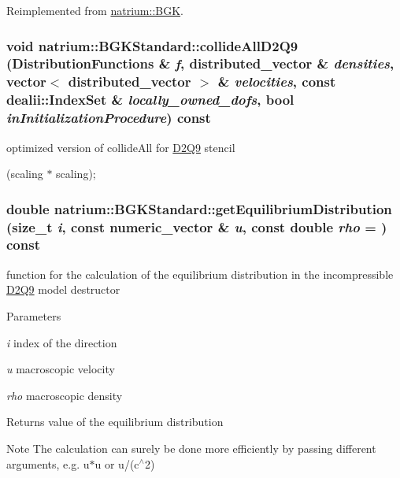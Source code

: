 Reimplemented from \hyperlink{classnatrium_1_1BGK_a9fa1c980217a183fc4762954e86ba36d}{natrium::BGK}.\hypertarget{classnatrium_1_1BGKStandard_aaaad49afea2e7079645b49380d990254}{
\subsubsection[{collideAllD2Q9}]{\setlength{\rightskip}{0pt plus 5cm}void natrium::BGKStandard::collideAllD2Q9 ({\bf DistributionFunctions} \& {\em f}, \/  {\bf distributed\_\-vector} \& {\em densities}, \/  vector$<$ {\bf distributed\_\-vector} $>$ \& {\em velocities}, \/  const dealii::IndexSet \& {\em locally\_\-owned\_\-dofs}, \/  bool {\em inInitializationProcedure}) const}}
\label{classnatrium_1_1BGKStandard_aaaad49afea2e7079645b49380d990254}


optimized version of collideAll for \hyperlink{classnatrium_1_1D2Q9}{D2Q9} stencil 

(scaling $\ast$ scaling); \hypertarget{classnatrium_1_1BGKStandard_a3d45ef2fe5536bf14914f99297477754}{
\subsubsection[{getEquilibriumDistribution}]{\setlength{\rightskip}{0pt plus 5cm}double natrium::BGKStandard::getEquilibriumDistribution (size\_\-t {\em i}, \/  const {\bf numeric\_\-vector} \& {\em u}, \/  const double {\em rho} = {}) const}}
\label{classnatrium_1_1BGKStandard_a3d45ef2fe5536bf14914f99297477754}


function for the calculation of the equilibrium distribution in the incompressible \hyperlink{classnatrium_1_1D2Q9}{D2Q9} model destructor


\begin{DoxyParams}{Parameters}
\item[{\em i}]index of the direction \item[{\em u}]macroscopic velocity \item[{\em rho}]macroscopic density \end{DoxyParams}
\begin{DoxyReturn}{Returns}
value of the equilibrium distribution 
\end{DoxyReturn}
\begin{DoxyNote}{Note}
The calculation can surely be done more efficiently by passing different arguments, e.g. u$\ast$u or u/(c$^\wedge$2) 
\end{DoxyNote}


